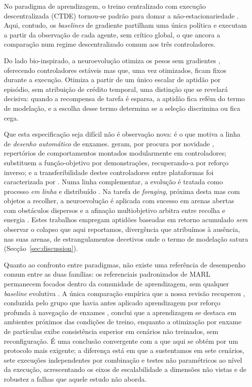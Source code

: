 \documentclass[final,5p,times,twocolumn,authoryear]{elsarticle}
\begin{document}
No paradigma de aprendizagem, o treino centralizado com execução descentralizada
(CTDE) tornou-se padrão para domar a não-estacionariedade \citep{lowe2017maddpg,
oliehoek2016concise}. Aqui, contudo, os \emph{baselines} de gradiente partilham
uma única política e executam a partir da observação de cada agente, sem crítico
global, o que ancora a comparação num regime descentralizado comum aos três
controladores.

Do lado bio-inspirado, a neuroevolução otimiza os pesos sem gradientes
\citep{salimans2017es, such2017deep}, oferecendo controladores estáveis mas que,
uma vez otimizados, ficam fixos durante a execução. Otimiza a partir de um
único escalar de aptidão por episódio, sem atribuição de crédito temporal, uma
distinção que se revelará decisiva: quando a recompensa de tarefa é esparsa, a
aptidão fica refém do termo de modelação, e a escolha desse termo determina se a
seleção discrimina ou fica cega.

Que esta especificação seja difícil não é observação nova: é o que motiva a linha
de \emph{desenho automático} de enxames. \citet{hasselmann2023novelty} geram, por
procura por novidade \citep{lehman2011abandoning}, repertórios de comportamentos
montados modularmente em controladores; \citet{szpirer2024composite} substituem a
função-objetivo por demonstrações, recuperando-a por reforço inverso; e a
transferibilidade destes controladores entre plataformas foi caracterizada por
\citet{kegeleirs2024transfer}. Numa linha complementar, a evolução é tratada como
processo \emph{em linha} e distribuído \citep{bredeche2022social,
fontbonne2020online}. Na tarefa de \emph{foraging}, próxima desta mas com objetos a recolher,
a neuroevolução é aplicada com sucesso em arenas abertas com obstáculos
dispersos \citep{zaman2025neat, biteng2025training} e a afinação multiobjetivo
arbitra entre recolha e energia \citep{ordaz2026foraging}. Estes trabalhos empregam
aptidões baseadas em retorno acumulado \emph{sem} observar o colapso que aqui
reportamos, divergência que atribuímos à ausência, nas suas arenas, de
estrangulamentos decetivos onde o termo de modelação satura
(Secção~\ref{sec:discussion}).

Quanto ao confronto entre paradigmas, não existe uma referência de desempenho
comum entre as duas famílias: os referenciais padronizados de MARL permanecem
focados dentro da comunidade de aprendizagem, sem qualquer \emph{baseline}
evolutiva \citep{bettini2024benchmarl}. A única comparação empírica que a nossa
revisão recuperou \citep{iskandar2024comparative}, conduzida pelo grupo que
havia antes aplicado aprendizagem por reforço profunda à navegação de enxames
\citep{iskandar2023navigation}, conclui que a aprendizagem se destaca em
ambientes próximos das condições de treino, enquanto a otimização por enxame de
partículas exibe consistência superior em cenários não treinados, sem
reconfiguração. É uma conclusão convergente com a que aqui se obtém por um
protocolo mais exigente; a diferença está em que a sustentamos em sete cenários,
sete execuções independentes por combinação e testes não paramétricos ao nível da
execução, acrescentando os eixos de escalabilidade a dimensões não vistas e de robustez a
falhas que aquele estudo não aborda.
\end{document}
